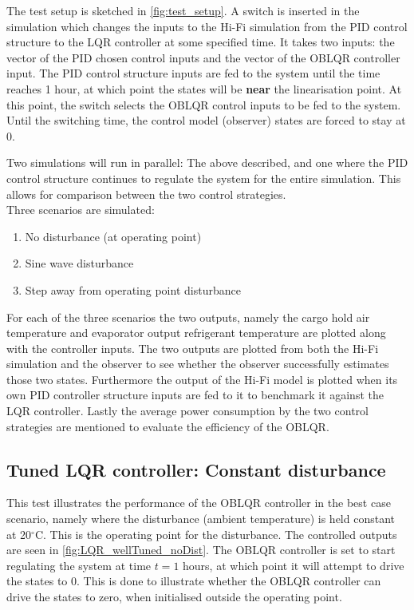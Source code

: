 The test setup is sketched in \cref{fig:test_setup}. A switch is inserted in the simulation which changes the inputs to the Hi-Fi simulation from the PID control structure to the LQR controller at some specified time. It takes two inputs: the vector of the PID chosen control inputs and the vector of the OBLQR controller input. The PID control structure inputs are fed to the system until the time reaches 1 hour, at which point the states will be \textbf{near} the linearisation point. At this point, the switch selects the OBLQR control inputs to be fed to the system. Until the switching time, the control model (observer) states are forced to stay at 0.

Two simulations will run in parallel: The above described, and one where the PID control structure continues to regulate the system for the entire simulation. This allows for comparison between the two control strategies.\\

Three scenarios are simulated:

\begin{enumerate}
	\item No disturbance (at operating point)
	\item Sine wave disturbance
	\item Step away from operating point disturbance
\end{enumerate}

\noindent For each of the three scenarios the two outputs, namely the cargo hold air temperature and evaporator output refrigerant temperature are plotted along with the controller inputs. The two outputs are plotted from both the Hi-Fi simulation and the observer to see whether the observer successfully estimates those two states. Furthermore the output of the Hi-Fi model is plotted when its own PID controller structure inputs are fed to it to benchmark it against the LQR controller. Lastly the average power consumption by the two control strategies are mentioned to evaluate the efficiency of the OBLQR.

\subsection{Tuned LQR controller: Constant disturbance}
This test illustrates the performance of the OBLQR controller in the best case scenario, namely where the disturbance (ambient temperature) is held constant at 20$^{\circ}$C. This is the operating point for the disturbance. The controlled outputs are seen in \cref{fig:LQR_wellTuned_noDist}. The OBLQR controller is set to start regulating the system at time $t=1$ hours, at which point it will attempt to drive the states to 0. This is done to illustrate whether the OBLQR controller can drive the states to zero, when initialised outside the operating point.

